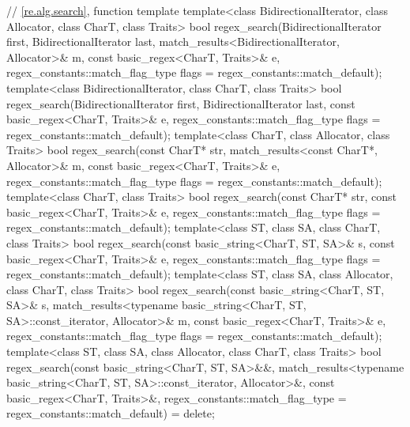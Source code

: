 \begin{codeblock}
{  // \ref{re.alg.search}, function template 
  template<class BidirectionalIterator, class Allocator, class CharT, class Traits>
    bool regex_search(BidirectionalIterator first, BidirectionalIterator last,
                      match_results<BidirectionalIterator, Allocator>& m,
                      const basic_regex<CharT, Traits>& e,
                      regex_constants::match_flag_type flags = regex_constants::match_default);
  template<class BidirectionalIterator, class CharT, class Traits>
    bool regex_search(BidirectionalIterator first, BidirectionalIterator last,
                      const basic_regex<CharT, Traits>& e,
                      regex_constants::match_flag_type flags = regex_constants::match_default);
  template<class CharT, class Allocator, class Traits>
    bool regex_search(const CharT* str,
                      match_results<const CharT*, Allocator>& m,
                      const basic_regex<CharT, Traits>& e,
                      regex_constants::match_flag_type flags = regex_constants::match_default);
  template<class CharT, class Traits>
    bool regex_search(const CharT* str,
                      const basic_regex<CharT, Traits>& e,
                      regex_constants::match_flag_type flags = regex_constants::match_default);
  template<class ST, class SA, class CharT, class Traits>
    bool regex_search(const basic_string<CharT, ST, SA>& s,
                      const basic_regex<CharT, Traits>& e,
                      regex_constants::match_flag_type flags = regex_constants::match_default);
  template<class ST, class SA, class Allocator, class CharT, class Traits>
    bool regex_search(const basic_string<CharT, ST, SA>& s,
                      match_results<typename basic_string<CharT, ST, SA>::const_iterator,
                                    Allocator>& m,
                      const basic_regex<CharT, Traits>& e,
                      regex_constants::match_flag_type flags = regex_constants::match_default);
  template<class ST, class SA, class Allocator, class CharT, class Traits>
    bool regex_search(const basic_string<CharT, ST, SA>&&,
                      match_results<typename basic_string<CharT, ST, SA>::const_iterator,
                                    Allocator>&,
                      const basic_regex<CharT, Traits>&,
                      regex_constants::match_flag_type
                        = regex_constants::match_default) = delete;

}
\end{codeblock}
